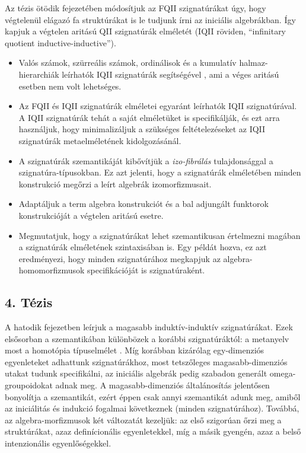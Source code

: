 \documentclass[12pt]{article}
\begin{document}
Az tézis ötödik fejezetében módosítjuk az FQII szignatúrákat úgy, hogy
végtelenül elágazó fa struktúrákat is le tudjunk írni az iniciális
algebrákban. Így kapjuk a végtelen aritású QII szignatúrák elméletét (IQII
röviden, ``infinitary quotient inductive-inductive'').
\begin{itemize}
\item Valós számok, szürreális számok, ordinálisok és a kumulatív halmaz-hierarchiák
  leírhatók IQII szignatúrák segítségével \cite{hottbook}, ami a véges aritású
  esetben nem volt lehetséges.
\item
  Az FQII és IQII szignatúrák elméletei egyaránt leírhatók IQII szignatúrával.
  A IQII szignatúrák tehát a saját elméletüket is specifikálják, és ezt arra használjuk,
  hogy minimalizáljuk a szükséges feltételezéseket az IQII szignatúrák metaelméletének
  kidolgozásánál.
\item
  A szignatúrák szemantikáját kibővítjük a \emph{izo-fibrálás} tulajdonsággal a
  szignatúra-típusokban. Ez azt jelenti, hogy a szignatúrák elméletében minden
  konstrukció megőrzi a leírt algebrák izomorfizmusait.
\item
  Adaptáljuk a term algebra konstrukciót és a bal adjungált funktorok konstrukcióját
  a végtelen aritású esetre.
\item
  Megmutatjuk, hogy a szignatúrákat lehet szemantikusan értelmezni magában a
  szignatúrák elméletének szintaxisában is. Egy példát hozva, ez azt
  eredményezi, hogy minden szignatúrához megkapjuk az algebra-homomorfizmusok
  specifikációját is szignatúraként.
\end{itemize}

\subsection*{4. Tézis}
A hatodik fejezetben leírjuk a magasabb induktív-induktív szignatúrákat. Ezek
elsősorban a szemantikában különbözek a korábbi szignatúráktól: a metanyelv most
a homotópia típuselmélet \cite{hottbook}. Míg korábban kizárólag egy-dimenziós
egyenleteket adhattunk szignatúrákhoz, most tetszőleges magasabb-dimenziós
utakat tudunk specifikálni, az iniciális algebrák pedig szabadon generált
omega-groupoidokat adnak meg. A magasabb-dimenziós általánosítás jelentősen
bonyolítja a szemantikát, ezért éppen csak annyi szemantikát adunk meg, amiből
az iniciálitás és indukció fogalmai következnek (minden szignatúrához). Továbbá,
az algebra-morfizmusok két változatát kezeljük: az első szigorúan őrzi meg a
struktúrákat, azaz definícionális egyenletekkel, míg a másik gyengén, azaz
a belső intenzionális egyenlőségekkel.
\end{document}
